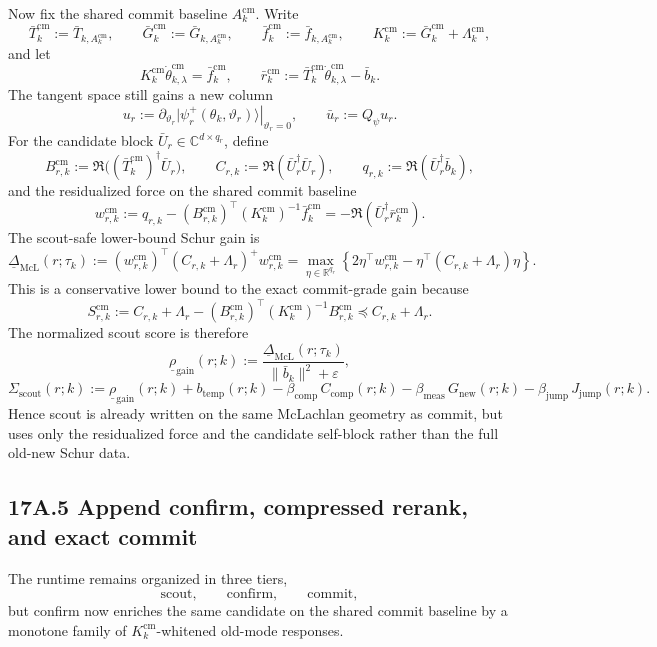 \documentclass[11pt]{article}
\begin{document}
Now fix the shared commit baseline \(A_k^{\mathrm{cm}}\). Write
\[
\bar T_k^{\mathrm{cm}}:=\bar T_{k,A_k^{\mathrm{cm}}},
\qquad
\bar G_k^{\mathrm{cm}}:=\bar G_{k,A_k^{\mathrm{cm}}},
\qquad
\bar f_k^{\mathrm{cm}}:=\bar f_{k,A_k^{\mathrm{cm}}},
\qquad
K_k^{\mathrm{cm}}:=\bar G_k^{\mathrm{cm}}+\Lambda_k^{\mathrm{cm}},
\]
and let
\[
K_k^{\mathrm{cm}}\dot\theta_{k,\lambda}^{\mathrm{cm}}=\bar f_k^{\mathrm{cm}},
\qquad
\bar r_k^{\mathrm{cm}}:=\bar T_k^{\mathrm{cm}}\dot\theta_{k,\lambda}^{\mathrm{cm}}-\bar b_k.
\]
The tangent space still gains a new column
\[
u_r:=\left.\partial_{\vartheta_r}|\psi_r^+(\theta_k,\vartheta_r)\rangle\right|_{\vartheta_r=0},
\qquad
\bar u_r:=Q_\psi u_r.
\]
For the candidate block \(\bar U_r\in\mathbb C^{d\times q_r}\), define
\[
B_{r,k}^{\mathrm{cm}}
:=
\Re\!\bigl((\bar T_k^{\mathrm{cm}})^\dagger \bar U_r\bigr),
\qquad
C_{r,k}
:=
\Re(\bar U_r^\dagger \bar U_r),
\qquad
q_{r,k}
:=
\Re(\bar U_r^\dagger \bar b_k),
\]
and the residualized force on the shared commit baseline
\[
w_{r,k}^{\mathrm{cm}}
:=
q_{r,k}-(B_{r,k}^{\mathrm{cm}})^\top (K_k^{\mathrm{cm}})^{-1}\bar f_k^{\mathrm{cm}}
=
-\Re(\bar U_r^\dagger \bar r_k^{\mathrm{cm}}).
\]
The scout-safe lower-bound Schur gain is
\[
\underline\Delta_{\mathrm{McL}}(r;\tau_k)
:=
(w_{r,k}^{\mathrm{cm}})^\top (C_{r,k}+\Lambda_r)^+ w_{r,k}^{\mathrm{cm}}
=
\max_{\eta\in\mathbb R^{q_r}}
\left\{
2\eta^\top w_{r,k}^{\mathrm{cm}}
-\eta^\top(C_{r,k}+\Lambda_r)\eta
\right\}.
\]
This is a conservative lower bound to the exact commit-grade gain because
\[
S_{r,k}^{\mathrm{cm}}
:=
C_{r,k}+\Lambda_r-(B_{r,k}^{\mathrm{cm}})^\top (K_k^{\mathrm{cm}})^{-1} B_{r,k}^{\mathrm{cm}}
\preceq
C_{r,k}+\Lambda_r.
\]
The normalized scout score is therefore
\[
\underline\rho_{\mathrm{gain}}(r;k)
:=
\frac{\underline\Delta_{\mathrm{McL}}(r;\tau_k)}{\|\bar b_k\|^2+\varepsilon},
\]
\[
\Sigma_{\mathrm{scout}}(r;k)
:=
\underline\rho_{\mathrm{gain}}(r;k)
+b_{\mathrm{temp}}(r;k)
-\beta_{\mathrm{comp}}\,C_{\mathrm{comp}}(r;k)
-\beta_{\mathrm{meas}}\,G_{\mathrm{new}}(r;k)
-\beta_{\mathrm{jump}}\,J_{\mathrm{jump}}(r;k).
\]
Hence scout is already written on the same McLachlan geometry as commit, but uses only the residualized force and the candidate self-block rather than the full old-new Schur data.

\subsection*{17A.5 Append confirm, compressed rerank, and exact commit}

The runtime remains organized in three tiers,
\[
\mathrm{scout},
\qquad
\mathrm{confirm},
\qquad
\mathrm{commit},
\]
but confirm now enriches the same candidate on the shared commit baseline by a monotone family of \(K_k^{\mathrm{cm}}\)-whitened old-mode responses.
\end{document}

